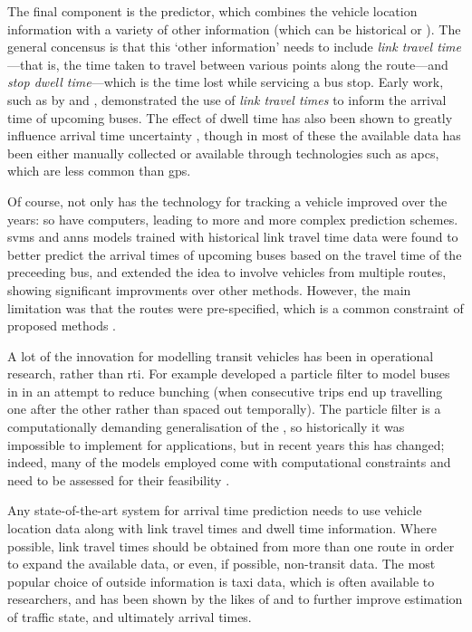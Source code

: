 The final component is the predictor, which combines the vehicle location information with a variety of other information (which can be historical or \rt{}). The general concensus is that this `other information' needs to include \emph{link travel time}---that is, the time taken to travel between various points along the route---and \emph{stop dwell time}---which is the time lost while servicing a bus stop. Early work, such as by \citet{Reinhoudt_1997} and \citet{Wall_1999}, demonstrated the use of \emph{link travel times} to inform the arrival time of upcoming buses. The effect of dwell time has also been shown to greatly influence arrival time uncertainty \citep{Jeong_2005,Meng_2013,Shen_2013,Robinson_2013,Gong_2013,Wang_2016}, though in most of these the available data has been either manually collected or available through technologies such as \glspl{apc}, which are less common than \gls{gps}.



Of course, not only has the technology for tracking a vehicle improved over the years: so have computers, leading to more and more complex prediction schemes. \Glspl{svm} \citep{Yu_2006,Yu_2010} and \glspl{ann} \citep{Mazloumi_2012,cn} models trained with historical link travel time data were found to better predict the arrival times of upcoming buses based on the travel time of the preceeding bus, and \citet{Yu_2011} extended the idea to involve vehicles from multiple routes, showing significant improvments over other methods. However, the main limitation was that the routes were pre-specified, which is a common constraint of proposed methods \citep{Chang_2010,Celan_2017,Celan_2018}.


A lot of the innovation for modelling transit vehicles has been in operational research, rather than \gls{rti}. For example \citet{Hans_2015} developed a particle filter to model buses in \rt{} in an attempt to reduce bunching (when consecutive trips end up travelling one after the other rather than spaced out temporally). The particle filter is a computationally demanding generalisation of the \kf{}, so historically it was impossible to implement for \rt{} applications, but in recent years this has changed; indeed, many of the \rt{} models employed come with computational constraints and need to be assessed for their feasibility \citep{Chang_2010,Cats_2016}.


Any state-of-the-art system for arrival time prediction needs to use \rt{} vehicle location data along with \rt{} link travel times and dwell time information. Where possible, link travel times should be obtained from more than one route in order to expand the available data, or even, if possible, non-transit data. The most popular choice of outside information is taxi data, which is often available to researchers, and has been shown by the likes of \citet{Xinghao_2013} and \citet{Ma_2019} to further improve estimation of traffic state, and ultimately arrival times.


